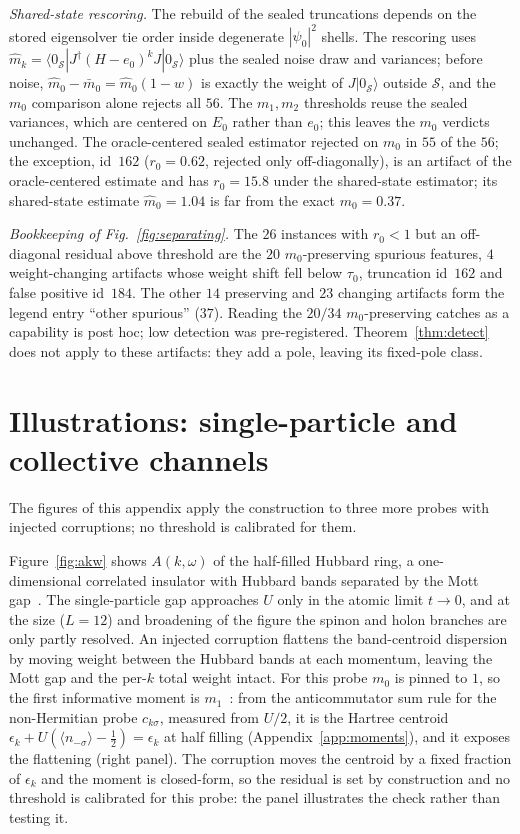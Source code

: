 \documentclass[submission, PhysCore]{SciPost}
\begin{document}
\begin{appendix}
\emph{Shared-state rescoring.} The rebuild of the sealed truncations depends on the stored eigensolver tie order inside degenerate $|\psi_0|^2$ shells. The rescoring uses $\widehat m_k=\langle0_\mathcal{S}|J^\dagger(H-e_0)^kJ|0_\mathcal{S}\rangle$ plus the sealed noise draw and variances; before noise, $\widehat m_0-\bar m_0=\widehat m_0(1-w)$ is exactly the weight of $J|0_\mathcal{S}\rangle$ outside $\mathcal{S}$, and the $m_0$ comparison alone rejects all $56$. The $m_1,m_2$ thresholds reuse the sealed variances, which are centered on $E_0$ rather than $e_0$; this leaves the $m_0$ verdicts unchanged. The oracle-centered sealed estimator rejected on $m_0$ in $55$ of the $56$; the exception, id~$162$ ($r_0=0.62$, rejected only off-diagonally), is an artifact of the oracle-centered estimate and has $r_0=15.8$ under the shared-state estimator; its shared-state estimate $\widehat m_0=1.04$ is far from the exact $m_0=0.37$.

\emph{Bookkeeping of Fig.~\ref{fig:separating}.} The $26$ instances with $r_0<1$ but an off-diagonal residual above threshold are the $20$ $m_0$-preserving spurious features, $4$ weight-changing artifacts whose weight shift fell below $\tau_0$, truncation id~$162$ and false positive id~$184$. The other $14$ preserving and $23$ changing artifacts form the legend entry ``other spurious'' ($37$). Reading the $20/34$ $m_0$-preserving catches as a capability is post hoc; low detection was pre-registered. Theorem~\ref{thm:detect} does not apply to these artifacts: they add a pole, leaving its fixed-pole class.

\section{Illustrations: single-particle and collective channels}
\label{app:illustrations}
The figures of this appendix apply the construction to three more probes with injected corruptions; no threshold is calibrated for them.

Figure~\ref{fig:akw} shows $A(k,\omega)$ of the half-filled Hubbard ring, a one-dimensional correlated insulator with Hubbard bands separated by the Mott gap~\cite{Hubbard1963,LiebWu1968,Dagotto1994}. The single-particle gap approaches $U$ only in the atomic limit $t\to0$, and at the size ($L=12$) and broadening of the figure the spinon and holon branches are only partly resolved. An injected corruption flattens the band-centroid dispersion by moving weight between the Hubbard bands at each momentum, leaving the Mott gap and the per-$k$ total weight intact. For this probe $m_0$ is pinned to $1$, so the first informative moment is $m_1$~\cite{Lehmann1954,Freericks2009}: from the anticommutator sum rule for the non-Hermitian probe $c_{k\sigma}$, measured from $U/2$, it is the Hartree centroid $\epsilon_k+U(\langle n_{-\sigma}\rangle-\tfrac12)=\epsilon_k$ at half filling (Appendix~\ref{app:moments}), and it exposes the flattening (right panel). The corruption moves the centroid by a fixed fraction of $\epsilon_k$ and the moment is closed-form, so the residual is set by construction and no threshold is calibrated for this probe: the panel illustrates the check rather than testing it.


\end{appendix}
\end{document}
